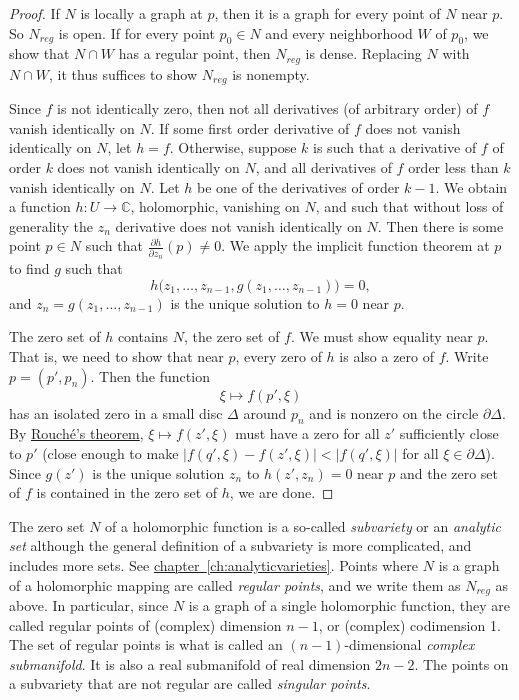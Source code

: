 \documentclass[12pt,openany]{book}
\newcommand{\sabs}[1]{\lvert {#1} \rvert}
\newcommand{\C}{{\mathbb{C}}}
\newcommand{\myindex}[1]{#1\index{#1}}
\theoremstyle{plain}
\theoremstyle{remark}
\theoremstyle{definition}
\theoremstyle{exercise}
\theoremstyle{example}
\newcommand{\chapterref}[1]{\hyperref[#1]{chapter~\ref*{#1}}}
\begin{document}
\begin{proof}
If $N$ is locally a graph at $p$, then it is a graph
for every point of $N$ near $p$.  So $N_{\mathit{reg}}$
is open.
If for every point $p_0 \in N$
and every neighborhood $W$ of $p_0$, we show that
$N \cap W$ has a regular point, then $N_{\mathit{reg}}$ is dense.
Replacing $N$ with $N \cap W$, it thus suffices to show
$N_{\mathit{reg}}$ is nonempty.

Since $f$ is not identically zero, then not all derivatives (of arbitrary
order) of $f$
vanish identically on $N$.
If some first order derivative of $f$ does not vanish identically on $N$,
let $h=f$.
Otherwise, suppose $k$ is such that a derivative of $f$ of order $k$
does not vanish identically on $N$, and
all derivatives of $f$ order less than $k$ vanish identically on
$N$.  Let $h$ be one of the derivatives of order $k-1$.
We obtain a function $h \colon U \to \C$, holomorphic, vanishing on $N$,
and such that 
without loss of generality the $z_n$ derivative does not vanish identically
on $N$.  Then there is some point $p \in N$ such that $\frac{\partial
h}{\partial z_n}(p) \not= 0$.
We apply the implicit function theorem at $p$ to find $g$ such that
\begin{equation*}
h\bigr(z_1,\ldots,z_{n-1},g(z_1,\ldots,z_{n-1})\bigr) = 0 ,
\end{equation*}
and $z_n = g(z_1,\ldots,z_{n-1})$ is the unique solution to
$h=0$ near $p$.

The zero set of $h$ contains $N$, the zero set of $f$.
We must show equality near $p$.  That is, we need to show that
near $p$, every zero of $h$ is also a zero of $f$.
Write $p = (p',p_n)$.  Then the function
\begin{equation*}
\xi \mapsto f(p',\xi)
\end{equation*}
has an isolated zero in a small disc $\Delta$ around $p_n$ and is
nonzero on the circle $\partial \Delta$.  By
\hyperref[thm:onevarrouche]{Rouch\'e's theorem},
$\xi \mapsto f(z',\xi)$ must have a zero for all $z'$ sufficiently close to $p'$
(close enough to make $\sabs{f(q',\xi)-f(z',\xi)} < \sabs{f(q',\xi)}$ for all $\xi \in
\partial \Delta$).
Since $g(z')$ is the unique solution $z_n$ to $h(z',z_n) = 0$
near $p$ and the
zero set of $f$ is contained in the zero set of $h$, we are done.
\end{proof}

The zero set $N$ of a holomorphic function is a so-called
\emph{\myindex{subvariety}}
or an \emph{\myindex{analytic set}}
although the general definition of a
subvariety is more complicated, and includes more sets.
See \chapterref{ch:analyticvarieties}.
Points where $N$ is a graph of a holomorphic mapping are called
\emph{regular points}, and we write them as
$N_{\mathit{reg}}$ as above.  In particular,
since $N$ is a graph of a single holomorphic function, they are called
regular points of (complex) dimension $n-1$, or (complex) codimension 1.
The set of regular points is what is called an
$(n-1)$-dimensional \emph{\myindex{complex submanifold}}.  It is also a real
submanifold of real dimension $2n-2$.
The points on a subvariety that are not regular are called
\emph{singular points}.
\end{document}
